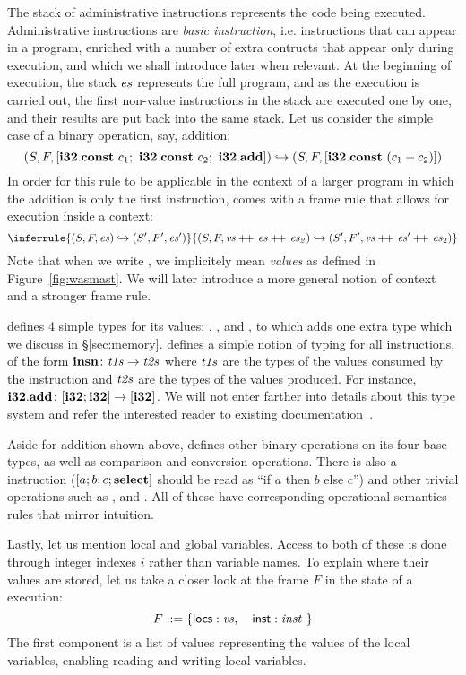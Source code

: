 \documentclass[acmsmall,screen]{acmart}\settopmatter{}
\begin{document}
The stack of administrative instructions represents the \wasm code being executed. Administrative instructions are \emph{basic instruction}, i.e. instructions that can appear in a \wasm program, enriched with a number of extra contructs that appear only during execution, and which we shall introduce later when relevant. At the beginning of execution, the stack \( \mathit{es} \) represents the full \wasm program, and as the execution is carried out, the first non-value instructions in the stack are executed one by one, and their results are put back into the same stack. Let us consider the simple case of a binary operation, say, \xxWithirtytwo addition:
\[ (S,F, [\mathbf{i32}.\mathbf{const}~c_1;~\mathbf{i32}.\mathbf{const}~c_2;~\mathbf{i32}.\mathbf{add}]) \hookrightarrow (S,F, [\mathbf{i32}.\mathbf{const}~(c_1 + c_2)]) \]
In order for this rule to be applicable in the context of a larger program in which the addition is only the first instruction, \wasm comes with a frame rule that allows for execution inside a context:
\[ \inferrule{(S,F,\V{es})\hookrightarrow(S',F',\V{es}')}{(S,F, \V{vs}\cat\V{es}\cat\V{es_2})\hookrightarrow(S',F',\V{vs}\cat\V{es}'\cat\V{es}_2)} \]
Note that when we write , we implicitely mean \emph{values} as defined in Figure~\ref{fig:wasmast}. We will later introduce a more general notion of context and a stronger frame rule.

\wasm defines 4 simple types for its values: \xxWithirtytwo, \xxWisixtyfour, \xxWfthirtytwo and \xxWfsixtyfour, to which \mswasm adds one extra type \xxWhandle which we discuss in \S\ref{sec:memory}. \wasm defines a simple notion of typing for all instructions, of the form \( \mathsf{\mathbf{insn}}\colon\mathit{t1s}\to\mathit{t2s} \) where \( \mathit{t1s} \) are the types of the values consumed by the instruction and \( \mathit{t2s} \) are the types of the values produced. For instance, \( \mathbf{i32}.\mathbf{add}\colon[\mathbf{i32};\mathbf{i32}]\to[\mathbf{i32}] \). We will not enter farther into details about this type system and refer the interested reader to existing documentation~\cite{wasm}.

Aside for addition shown above, \wasm defines other binary operations on its four base types, as well as comparison and conversion operations. There is also a \xxWselect instruction (\( [a;b;c;\mathbf{select}] \) should be read as ``if \( a \) then \( b \) else \( c \)'') and other trivial operations such as \xxWdrop, \xxWnop and \xxWunreachable. All of these have corresponding operational semantics rules that mirror intuition.

Lastly, let us mention local and global variables. Access to both of these is done through integer indexes \( i \) rather than variable names. To explain where their values are stored, let us take a closer look at the frame \( F \) in the state of a \wasm execution:
\[  F::=\{ \mathsf{locs} : \mathit{vs}, \quad \mathsf{inst} : \mathit{inst} ~ \} \]
The first component  is a list of values representing the values of the local variables, enabling reading and writing local variables.
\end{document}
